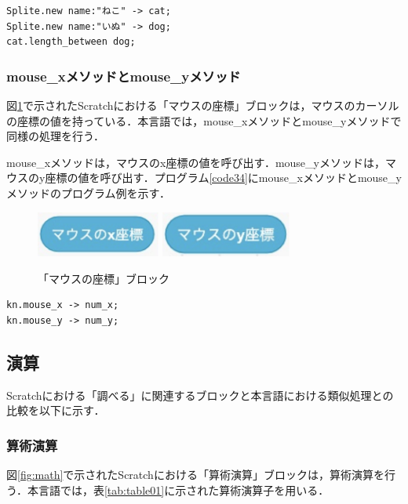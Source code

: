 \documentclass[10pt,a4j]{ltjsarticle}
\begin{document}
\begin{lstlisting}[caption=length\_betweenメソッドのプログラム例, label=code33]
Splite.new name:"ねこ" -> cat;
Splite.new name:"いぬ" -> dog;
cat.length_between dog;
\end{lstlisting}

\subsubsection{mouse\_xメソッドとmouse\_yメソッド}
図\ref{fig:length}で示されたScratchにおける「マウスの座標」ブロックは，マウスのカーソルの座標の値を持っている．本言語では，mouse\_xメソッドとmouse\_yメソッドで同様の処理を行う．

mouse\_xメソッドは，マウスのx座標の値を呼び出す．mouse\_yメソッドは，マウスのy座標の値を呼び出す．プログラム\ref{code34}にmouse\_xメソッドとmouse\_yメソッドのプログラム例を示す．

\begin{figure}[H]
  \centering
  \includegraphics[height=15mm]{images/mouse_x.pdf} 
  \includegraphics[height=15mm]{images/mouse_y.pdf} 
  \caption{「マウスの座標」ブロック}
  \label{fig:length}
\end{figure}

\begin{lstlisting}[caption=mouse\_xメソッドとmouse\_yメソッドのプログラム例, label=code34]
kn.mouse_x -> num_x;
kn.mouse_y -> num_y;
\end{lstlisting}

\subsection{演算}
Scratchにおける「調べる」に関連するブロックと本言語における類似処理との比較を以下に示す．
\subsubsection{算術演算}
図\ref{fig:math}で示されたScratchにおける「算術演算」ブロックは，算術演算を行う．本言語では，表\ref{tab:table01}に示された算術演算子を用いる．
\end{document}

